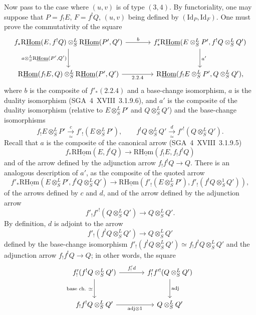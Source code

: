 \documentclass[11pt]{article}
\providecommand{\Id}{\mathrm{Id}}
\begin{document}
Now pass to the case where $(u,v)$ is of type $(3,4)$. By functoriality, one may suppose that $P=f_{!}E$, $F=f^{!}Q$, $(u,v)$ being defined by $(\Id_P,\Id_F)$. One must prove the commutativity of the square
\[
\begin{tikzcd}[column sep=large,row sep=large]
f_*\mathrm{R}\underline{\mathrm{Hom}}(E,f^!Q)\otimes^L_S\mathrm{R}\underline{\mathrm{Hom}}(P',Q') \arrow[r,"b"] \arrow[d,"{a\otimes^L_S\mathrm{R}\underline{\mathrm{Hom}}(P',Q')}"'] & f'_*\mathrm{R}\underline{\mathrm{Hom}}(E\otimes^L_SP',f^!Q\otimes^L_SQ') \arrow[d,"a'"]\\
\mathrm{R}\underline{\mathrm{Hom}}(f_!E,Q)\otimes^L_S\mathrm{R}\underline{\mathrm{Hom}}(P',Q') \arrow[r,"2.2.4"'] & \mathrm{R}\underline{\mathrm{Hom}}(f_!E\otimes^L_SP',Q\otimes^L_SQ'),
\end{tikzcd}
\]
where $b$ is the composite of $f'_*(2.2.4)$ and a base-change isomorphism, $a$ is the duality isomorphism (SGA~4~XVIII~3.1.9.6), and $a'$ is the composite of the duality isomorphism (relative to $E\otimes^L_SP'$ and $Q\otimes^L_SQ'$) and the base-change isomorphisms
\[
f_!E\otimes^L_SP'\xrightarrow[\simeq]{c}f'_!(E\otimes^L_SP'),
\qquad
f^!Q\otimes^L_SQ'\xrightarrow[\simeq]{d}f'^!(Q\otimes^L_SQ').
\]
Recall that $a$ is the composite of the canonical arrow (SGA~4~XVIII~3.1.9.5)
\[
f_*\mathrm{R}\underline{\mathrm{Hom}}(E,f^!Q)\longrightarrow\mathrm{R}\underline{\mathrm{Hom}}(f_!E,f_!f^!Q)
\]
and of the arrow defined by the adjunction arrow $f_!f^!Q\to Q$. There is an analogous description of $a'$, as the composite of the quoted arrow
\begin{equation}\tag{*}
f'_*\mathrm{R}\underline{\mathrm{Hom}}(E\otimes^L_SP',f^!Q\otimes^L_SQ')\longrightarrow
\mathrm{R}\underline{\mathrm{Hom}}(f'_!(E\otimes^L_SP'),f'_!(f^!Q\otimes^1_SQ')),
\end{equation}
of the arrows defined by $c$ and $d$, and of the arrow defined by the adjunction arrow
\[
f'_!f'^!(Q\otimes^L_SQ')\longrightarrow Q\otimes^L_SQ'.
\]
By definition, $d$ is adjoint to the arrow
\[
f'_!(f^!Q\otimes^L_SQ')\longrightarrow Q\otimes^L_SQ'
\]
defined by the base-change isomorphism $f'_!(f^!Q\otimes^L_SQ')\simeq f_!f^!Q\otimes^L_SQ'$ and the adjunction arrow $f_!f^!Q\to Q$; in other words, the square
\[
\begin{tikzcd}[column sep=large,row sep=large]
f'_!(f^!Q\otimes^L_SQ') \arrow[r,"{f'_!d}"] \arrow[d,"{\text{base ch.}\ \simeq}"'] & f'_!f'^!(Q\otimes^L_SQ') \arrow[d,"\mathrm{adj}"]\\
f_!f^!Q\otimes^L_SQ' \arrow[r,"{\mathrm{adj}\otimes 1}"'] & Q\otimes^L_SQ'
\end{tikzcd}
\]
\end{document}
